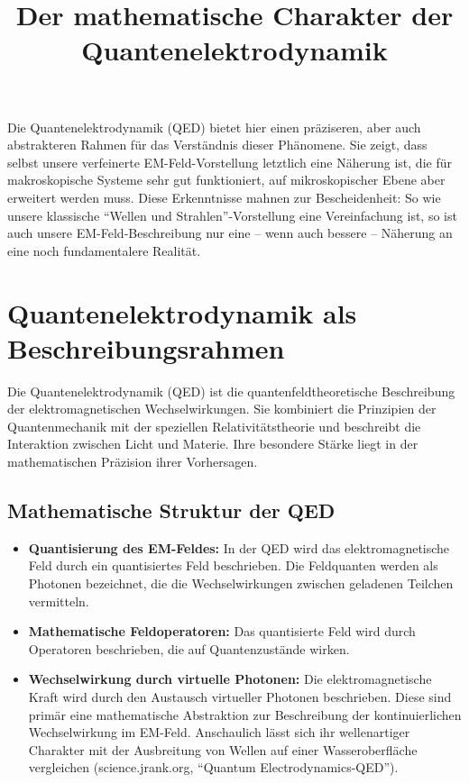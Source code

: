\documentclass[12pt,a4paper]{article}
\begin{document}
	Die Quantenelektrodynamik (QED) bietet hier einen präziseren, aber auch abstrakteren Rahmen für das Verständnis dieser Phänomene. Sie zeigt, dass selbst unsere verfeinerte EM-Feld-Vorstellung letztlich eine Näherung ist, die für makroskopische Systeme sehr gut funktioniert, auf mikroskopischer Ebene aber erweitert werden muss.
	Diese Erkenntnisse mahnen zur Bescheidenheit: So wie unsere klassische ``Wellen und Strahlen''-Vorstellung eine Vereinfachung ist, so ist auch unsere EM-Feld-Beschreibung nur eine -- wenn auch bessere -- Näherung an eine noch fundamentalere Realität.
	


\title{Der mathematische Charakter der Quantenelektrodynamik}
\author{}
\date{}


	\maketitle
	
	\section{Quantenelektrodynamik als Beschreibungsrahmen}
	Die Quantenelektrodynamik (QED) ist die quantenfeldtheoretische Beschreibung der elektromagnetischen Wechselwirkungen. Sie kombiniert die Prinzipien der Quantenmechanik mit der speziellen Relativitätstheorie und beschreibt die Interaktion zwischen Licht und Materie. Ihre besondere Stärke liegt in der mathematischen Präzision ihrer Vorhersagen.
	
	\subsection{Mathematische Struktur der QED}
	\begin{itemize}
		\item \textbf{Quantisierung des EM-Feldes:} In der QED wird das elektromagnetische Feld durch ein quantisiertes Feld beschrieben. Die Feldquanten werden als Photonen bezeichnet, die die Wechselwirkungen zwischen geladenen Teilchen vermitteln.
		\item \textbf{Mathematische Feldoperatoren:} Das quantisierte Feld wird durch Operatoren beschrieben, die auf Quantenzustände wirken.
		\item \textbf{Wechselwirkung durch virtuelle Photonen:} Die elektromagnetische Kraft wird durch den Austausch virtueller Photonen beschrieben. Diese sind primär eine mathematische Abstraktion zur Beschreibung der kontinuierlichen Wechselwirkung im EM-Feld. Anschaulich lässt sich ihr wellenartiger Charakter mit der Ausbreitung von Wellen auf einer Wasseroberfläche vergleichen (science.jrank.org, ``Quantum Electrodynamics-QED'').
	\end{itemize}
	
\end{document}
